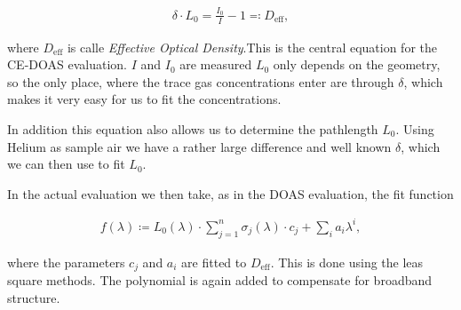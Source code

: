 \begin{align}
  \delta \cdot L_0 = \frac{I_0}{I} - 1 \eqqcolon D_{\text{eff}}, \label{eq:ce-central}
\end{align}

where $D_{\text{eff}}$ is calle \emph{Effective Optical Density}.This
is the central equation for the CE-DOAS evaluation. $I$ and $I_0$ are
measured $L_0$ only depends on the geometry, so the only place, where
the trace gas concentrations enter are through $\delta$, which makes
it very easy for us to fit the concentrations.

In addition this equation also allows us to determine the pathlength
$L_0$. Using Helium as sample air we have a rather large difference
and well known $\delta$, which we can then use to fit
$L_0$.

In the actual evaluation we then take, as in the DOAS evaluation, the fit function

\begin{align*}
  f(\lambda) \coloneqq L_0(\lambda)\cdot\sum_{j=1}^n \sigma_j(\lambda)
  \cdot c_j + \sum_i a_i \lambda^i,
\end{align*}

where the parameters $c_j$ and $a_i$ are fitted to
$D_{\text{eff}}$. This is done using the leas square methods. The
polynomial is again added to compensate for broadband structure.

